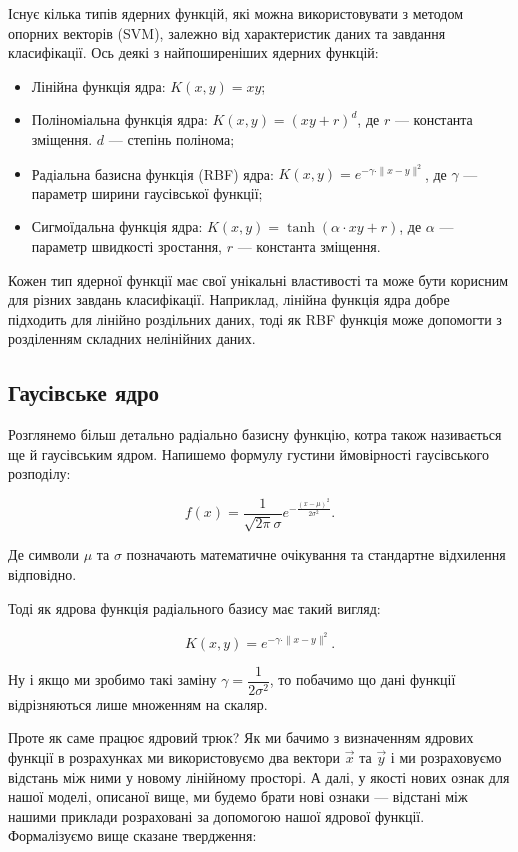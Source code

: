 \documentclass[]{article}
\begin{document}
Існує кілька типів ядерних функцій, які можна використовувати з методом опорних векторів (SVM), залежно від характеристик даних та завдання класифікації. Ось деякі з найпоширеніших ядерних функцій:

\begin{itemize}
	\item Лінійна функція ядра: $K(x, y) = xy$;
	\item Поліноміальна функція ядра: $K(x, y) = (xy + r)^d$, де $r$ --- константа зміщення. $d$ --- степінь полінома;
	\item Радіальна базисна функція (RBF) ядра: $K(x, y) = e^{-\gamma \cdot \|x - y\|^2}$, де $\gamma$ --- параметр ширини гаусівської функції;
	\item Сигмоїдальна функція ядра: $K(x, y) = \tanh(\alpha\cdot xy + r)$, де $\alpha$ ---  параметр швидкості зростання,  $r$ --- константа зміщення.
\end{itemize}

Кожен тип ядерної функції має свої унікальні властивості та може бути корисним для різних завдань класифікації. Наприклад, лінійна функція ядра добре підходить для лінійно роздільних даних, тоді як RBF функція може допомогти з розділенням складних нелінійних даних.

\subsection{Гаусівське ядро}

Розглянемо більш детально радіально базисну функцію, котра також називається ще й гаусівським ядром. Напишемо формулу густини ймовірності гаусівського розподілу:

\begin{equation*}
	f(x) = \frac1{\sqrt{2\pi}\sigma}e^{-\frac{(x - \mu)^2}{2\sigma^2}}.
\end{equation*}

Де символи $\mu$ та $\sigma$ позначають математичне очікування та стандартне відхилення відповідно.

Тоді як ядрова функція радіального базису має такий вигляд:

\begin{equation*}
	K(x, y) = e^{-\gamma \cdot \|x - y\|^2}.
\end{equation*}

Ну і якщо ми зробимо такі заміну $\gamma = \dfrac1{2\sigma^2}$, то побачимо що дані функції відрізняються лише множенням на скаляр.

Проте як саме працює ядровий трюк? Як ми бачимо з визначенням ядрових функції в розрахунках ми використовуємо два вектори $\vec{x}$ та $\vec{y}$ і ми розраховуємо відстань між ними у новому лінійному просторі. А далі, у якості нових ознак для нашої моделі, описаної вище, ми будемо брати нові ознаки --- відстані між нашими приклади розраховані за допомогою нашої ядрової функції. Формалізуємо вище сказане твердження:
\end{document}
